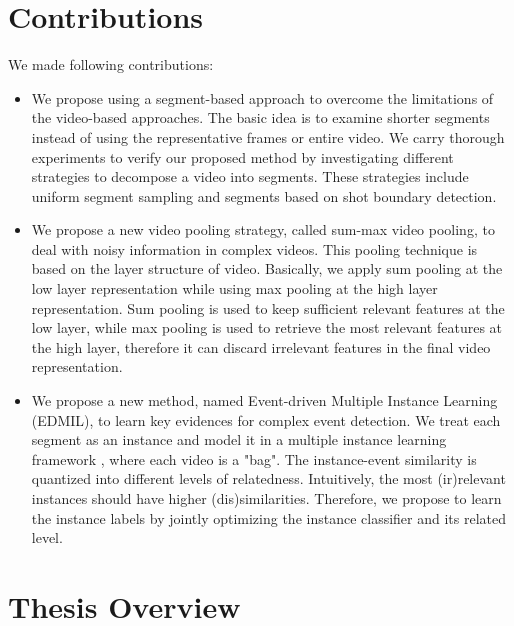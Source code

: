 \section{Contributions}

We made following contributions:

\begin{itemize}
\item We propose using a segment-based approach to overcome the limitations of  the video-based approaches. The basic idea is to examine shorter segments instead of using the representative frames or entire video. We carry thorough experiments to verify our proposed method by investigating different strategies to decompose a video into segments. These strategies include uniform segment sampling and segments based on shot boundary detection.

\item We propose a new video pooling strategy, called sum-max video pooling, to deal with noisy information in complex videos. This pooling technique is based on the layer structure of video. Basically, we apply sum pooling at the low layer representation while using max pooling at the high layer representation. Sum pooling is used to keep sufficient relevant features at the low layer, while max pooling is used to retrieve the most relevant features at the high layer, therefore it can discard irrelevant features in the final video representation. 
	
\item We propose a new method, named  Event-driven Multiple Instance Learning (EDMIL), to learn key evidences for complex event detection. We treat each segment as an instance and model it in a multiple instance learning framework \cite{andrews2002support}, where each video is a "bag". The instance-event similarity is quantized into different levels of relatedness. Intuitively, the most (ir)relevant instances should have higher (dis)similarities. Therefore, we propose to learn the instance labels by jointly optimizing the instance classifier and its related level.
	
\end{itemize}

\section{Thesis Overview}


